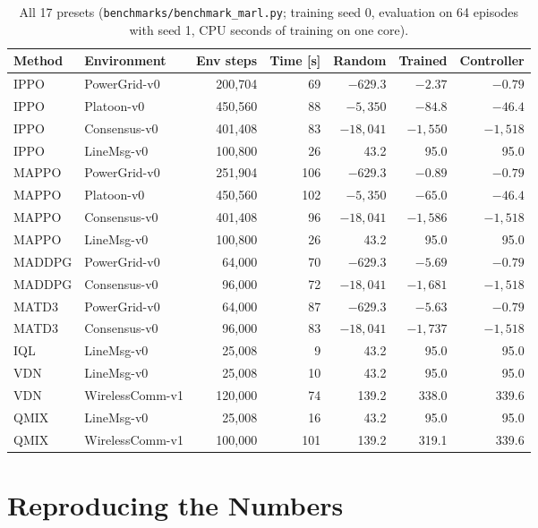 \documentclass{article}
\newcommand{\file}[1]{\nolinkurl{#1}}
\begin{document}
\begin{table}[h]
  \caption{All 17 presets (\file{benchmarks/benchmark_marl.py}; training
    seed 0, evaluation on 64 episodes with seed 1, CPU seconds of training on
    one core).}
  \label{tab:presets}
  \centering\small
  \begin{tabular}{@{}llrrrrr@{}}
    \toprule
    Method & Environment & Env steps & Time [s] & Random & Trained & Controller \\
    \midrule
    IPPO & PowerGrid-v0 & 200,704 & 69 & $-629.3$ & $-2.37$ & $-0.79$ \\
    IPPO & Platoon-v0 & 450,560 & 88 & $-5{,}350$ & $-84.8$ & $-46.4$ \\
    IPPO & Consensus-v0 & 401,408 & 83 & $-18{,}041$ & $-1{,}550$ & $-1{,}518$ \\
    IPPO & LineMsg-v0 & 100,800 & 26 & 43.2 & 95.0 & 95.0 \\
    MAPPO & PowerGrid-v0 & 251,904 & 106 & $-629.3$ & $-0.89$ & $-0.79$ \\
    MAPPO & Platoon-v0 & 450,560 & 102 & $-5{,}350$ & $-65.0$ & $-46.4$ \\
    MAPPO & Consensus-v0 & 401,408 & 96 & $-18{,}041$ & $-1{,}586$ & $-1{,}518$ \\
    MAPPO & LineMsg-v0 & 100,800 & 26 & 43.2 & 95.0 & 95.0 \\
    MADDPG & PowerGrid-v0 & 64,000 & 70 & $-629.3$ & $-5.69$ & $-0.79$ \\
    MADDPG & Consensus-v0 & 96,000 & 72 & $-18{,}041$ & $-1{,}681$ & $-1{,}518$ \\
    MATD3 & PowerGrid-v0 & 64,000 & 87 & $-629.3$ & $-5.63$ & $-0.79$ \\
    MATD3 & Consensus-v0 & 96,000 & 83 & $-18{,}041$ & $-1{,}737$ & $-1{,}518$ \\
    IQL & LineMsg-v0 & 25,008 & 9 & 43.2 & 95.0 & 95.0 \\
    VDN & LineMsg-v0 & 25,008 & 10 & 43.2 & 95.0 & 95.0 \\
    VDN & WirelessComm-v1 & 120,000 & 74 & 139.2 & 338.0 & 339.6 \\
    QMIX & LineMsg-v0 & 25,008 & 16 & 43.2 & 95.0 & 95.0 \\
    QMIX & WirelessComm-v1 & 100,000 & 101 & 139.2 & 319.1 & 339.6 \\
    \bottomrule
  \end{tabular}
\end{table}

\section{Reproducing the Numbers}\label{app:repro}
\end{document}
